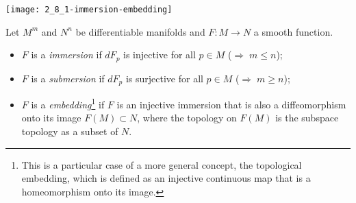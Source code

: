 \begin{marginfigure}
	\texttt{[image: 2\_8\_1-immersion-embedding]}
\end{marginfigure}
\begin{definition}
	Let $M^m$ and $N^n$ be differentiable manifolds and $F:M\to N$ a smooth function.
	\begin{itemize}
		\item $F$ is a \emph{immersion} if $dF_p$ is injective for all $p\in M$ ($\Rightarrow\; m\leq n$);
		\item $F$ is a \emph{submersion} if $dF_p$ is surjective for all $p\in M$ ($\Rightarrow\; m\geq n$);
		\item $F$ is a \emph{embedding}\footnote{This is a particular case of a more general concept, the topological embedding, which is defined as an injective continuous map that is a homeomorphism onto its image.} if $F$ is an injective immersion that is also a diffeomorphism onto its image $F(M)\subset N$, where the topology on $F(M)$ is the subspace topology as a subset of $N$.
	\end{itemize}
\end{definition}

